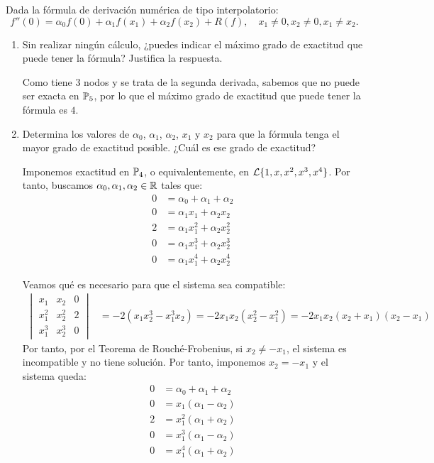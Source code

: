 \begin{ejercicio}\label{ej:2.2.5}
    Dada la fórmula de derivación numérica de tipo interpolatorio:
    \[
    f''(0) = \alpha_0 f(0) + \alpha_1 f(x_1) + \alpha_2 f(x_2) + R(f), \quad x_1 \neq 0, x_2 \neq 0, x_1 \neq x_2.
    \]
    \begin{enumerate}
        \item Sin realizar ningún cálculo, ¿puedes indicar el máximo grado de exactitud que puede tener la fórmula? Justifica la respuesta.
        
        Como tiene $3$ nodos y se trata de la segunda derivada, sabemos que no puede ser exacta en $\mathbb{P}_5$, por lo que el máximo grado de exactitud que puede tener la fórmula es $4$.
        
        \item Determina los valores de $\alpha_0$, $\alpha_1$, $\alpha_2$, $x_1$ y $x_2$ para que la fórmula tenga el mayor grado de exactitud posible. ¿Cuál es ese grado de exactitud?
        
        Imponemos exactitud en $\mathbb{P}_4$, o equivalentemente, en $\mathcal{L}\{1, x, x^2,x^3,x^4\}$. Por tanto, buscamos $\alpha_0,\alpha_1,\alpha_2\in\mathbb{R}$ tales que:
        \begin{align*}
            0 &= \alpha_0 + \alpha_1 + \alpha_2 \\
            0 &= \alpha_1x_1 + \alpha_2x_2 \\
            2 &= \alpha_1x_1^2 + \alpha_2x_2^2 \\
            0 &= \alpha_1x_1^3 + \alpha_2x_2^3\\
            0 &= \alpha_1x_1^4 + \alpha_2x_2^4
        \end{align*}

        Veamos qué es necesario para que el sistema sea compatible:
        \begin{align*}
            \begin{vmatrix}
                x_1 & x_2 & 0 \\
                x_1^2 & x_2^2 & 2 \\
                x_1^3 & x_2^3 & 0
            \end{vmatrix} &= -2\left(x_1x_2^3-x_1^3x_2\right) = -2x_1x_2(x_2^2-x_1^2) = -2x_1x_2(x_2+x_1)(x_2-x_1)
        \end{align*}
        Por tanto, por el Teorema de Rouché-Frobenius, si $x_2\neq -x_1$, el sistema es incompatible y no tiene solución. Por tanto, imponemos $x_2=-x_1$ y el sistema queda:
        \begin{align*}
            0 &= \alpha_0 + \alpha_1 + \alpha_2 \\
            0 &= x_1(\alpha_1- \alpha_2) \\
            2 &= x_1^2(\alpha_1 + \alpha_2) \\
            0 &= x_1^3(\alpha_1 - \alpha_2)\\
            0 &= x_1^4(\alpha_1 + \alpha_2)
        \end{align*}


\end{enumerate}
\end{ejercicio}

